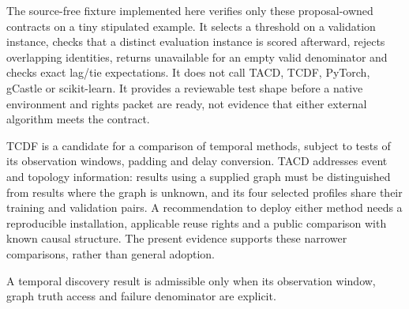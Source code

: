 The source-free fixture implemented here verifies only these proposal-owned contracts on a tiny
stipulated example. It selects a threshold on a validation instance, checks that a distinct
evaluation instance is scored afterward, rejects overlapping identities, returns unavailable
for an empty valid denominator and checks exact lag/tie expectations. It does not call TACD,
TCDF, PyTorch, gCastle or scikit-learn. It provides a reviewable test shape before a native
environment and rights packet are ready, not evidence that either external algorithm meets the
contract.

TCDF is a candidate for a comparison of temporal methods, subject to
tests of its observation windows, padding and delay conversion. TACD addresses
event and topology information: results using a supplied graph must be
distinguished from results where the graph is unknown, and its four selected
profiles share their training and validation pairs. A recommendation to deploy
either method needs a reproducible installation, applicable reuse rights and
a public comparison with known causal structure. The present evidence supports
these narrower comparisons, rather than general adoption.

A temporal discovery result is admissible only when its observation window, graph truth access and failure denominator are explicit.
